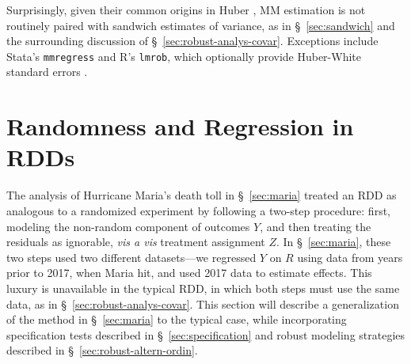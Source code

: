 Surprisingly, given their common origins in %
Huber \citeyearpar{huber1964robust}, MM estimation is not routinely
paired with sandwich estimates of variance, as in \S~\ref{sec:sandwich} and
the surrounding discussion of \S~\ref{sec:robust-analys-covar}.
Exceptions include Stata's \texttt{mmregress} and R's \texttt{lmrob},
which optionally provide Huber-White standard errors
\citep{verardiCroux2009robust,rousseuwetal2015robustbase}.


\section{Randomness and Regression in RDDs}\label{sec:theMethod}




The analysis of Hurricane Maria's death toll in \S~\ref{sec:maria}
treated an RDD as analogous to a randomized experiment by following a
two-step procedure: first, modeling the non-random component of
outcomes $Y$, and then treating the residuals as ignorable, \emph{vis
  a vis} treatment assignment $Z$.
In \S~\ref{sec:maria}, these two steps used two different
datasets---we regressed $Y$ on $R$ using data from years prior to
2017, when Maria hit, and used 2017 data to estimate effects.
This luxury is unavailable in the typical RDD, in which both steps
must use the same data, as in \S~\ref{sec:robust-analys-covar}.
This section will describe a generalization of the method in
\S~\ref{sec:maria} to the typical case, while incorporating
specification tests described in \S~\ref{sec:specification} and robust
modeling strategies described in \S~\ref{sec:robust-altern-ordin}.

